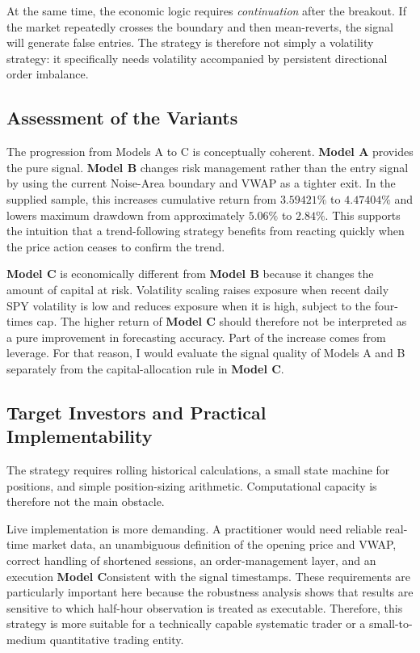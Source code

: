 \documentclass{article}
\begin{document}
At the same time, the economic logic requires \emph{continuation} after the breakout. If the market repeatedly crosses the boundary and then mean-reverts, the signal will generate false entries. The strategy is therefore not simply a volatility strategy: it specifically needs volatility accompanied by persistent directional order imbalance.

\subsection{Assessment of the Variants}

The progression from Models A to C is conceptually coherent.\textbf{ Model A} provides the pure signal.\textbf{ Model B} changes risk management rather than the entry signal by using the current Noise-Area boundary and VWAP as a tighter exit. In the supplied sample, this increases cumulative return from \(3.59421\%\) to \(4.47404\%\) and lowers maximum drawdown from approximately \(5.06\%\) to \(2.84\%\). This supports the intuition that a trend-following strategy benefits from reacting quickly when the price action ceases to confirm the trend.

\textbf{Model C} is economically different from\textbf{ Model B} because it changes the amount of capital at risk. Volatility scaling raises exposure when recent daily SPY volatility is low and reduces exposure when it is high, subject to the four-times cap. The higher return of\textbf{ Model C} should therefore not be interpreted as a pure improvement in forecasting accuracy. Part of the increase comes from leverage. For that reason, I would evaluate the signal quality of Models A and B separately from the capital-allocation rule in\textbf{ Model C}.

\subsection{Target Investors and Practical Implementability}

The strategy requires rolling historical calculations, a small state machine for positions, and simple position-sizing arithmetic. Computational capacity is therefore not the main obstacle.

Live implementation is more demanding. A practitioner would need reliable real-time market data, an unambiguous definition of the opening price and VWAP, correct handling of shortened sessions, an order-management layer, and an execution\textbf{ Model C}onsistent with the signal timestamps. These requirements are particularly important here because the robustness analysis shows that results are sensitive to which half-hour observation is treated as executable. Therefore, this strategy is more suitable for a technically capable systematic trader or a small-to-medium quantitative trading entity.
\end{document}
